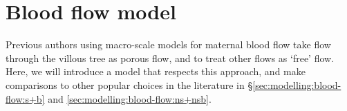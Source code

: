
    \section{Blood flow model} \label{sec:modelling:blood-flow}        
        Previous authors using macro-scale models for maternal blood flow take flow through the villous tree as porous flow, and to treat other flows as `free' flow. Here, we will introduce a model that respects this approach, and make comparisons to other popular choices in the literature \cite{lecarpentierComputationalFluidDynamic2016,chernyavskyMathematicalModelIntervillous2010,meklerImpactTissuePorosity2022,erianMaternalPlacentalBlood1977,saghianAssociationPlacentalJets2017} in \S\ref{sec:modelling:blood-flow:s+b} and \ref{sec:modelling:blood-flow:ns+nsb}.
            

